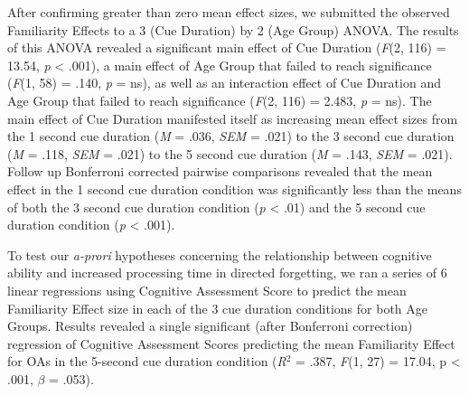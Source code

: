 \documentclass[man]{apa6}
\begin{document}
After confirming greater than zero mean effect sizes, we submitted the observed Familiarity Effects to a 3 (Cue Duration) by 2 (Age Group) ANOVA. The results of this ANOVA revealed a significant main effect of Cue Duration (\textit{F}(2, 116) = 13.54, \textit{p} < .001), a main effect of Age Group that failed to reach significance (\textit{F}(1, 58) = .140, \textit{p} = ns), as well as an interaction effect of Cue Duration and Age Group that failed to reach significance (\textit{F}(2, 116) = 2.483, \textit{p} = ns). The main effect of Cue Duration manifested itself as increasing mean effect sizes from the 1 second cue duration (\textit{M} = .036, \textit{SEM} = .021) to the 3 second cue duration (\textit{M} = .118, \textit{SEM} = .021) to the 5 second cue duration (\textit{M} = .143, \textit{SEM} = .021). Follow up Bonferroni corrected pairwise comparisons revealed that the mean effect in the 1 second cue duration condition was significantly less than the means of both the 3 second cue duration condition (\textit{p} < .01) and the 5 second cue duration condition (\textit{p} < .001).

To test our \textit{a-prori} hypotheses concerning the relationship between cognitive ability and increased processing time in directed forgetting, we ran a series of 6 linear regressions using Cognitive Assessment Score to predict the mean Familiarity Effect size in each of the 3 cue duration conditions for both Age Groups. Results revealed a single significant (after Bonferroni correction) regression of Cognitive Assessment Scores predicting the mean Familiarity Effect for OAs in the 5-second cue duration condition (\textit{R}$^{2}$ = .387, \textit{F}(1, 27) = 17.04, p < .001, $\beta$ = .053).
\end{document}

